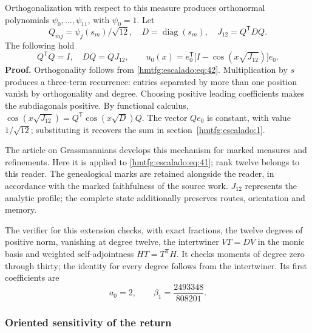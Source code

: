 Orthogonalization with respect to this measure produces orthonormal polynomials \(\psi_0,\ldots,\psi_{11}\), with \(\psi_0=1\). Let
\[
Q_{mj}=\psi_j(s_m)/\sqrt{12},\quad
D=\operatorname{diag}(s_m),\quad J_{12}=Q^{\mathsf T}DQ.
\]
The following hold
\begin{equation}
Q^{\mathsf T}Q=I,\quad DQ=QJ_{12},\qquad
\boxed{u_0(x)=e_0^{\mathsf T}
\bigl[I-\cos(x\sqrt{J_{12}})\bigr]e_0.}
\label{hmtfg:escalado:eq:43}
\end{equation}
\textbf{Proof.} Orthogonality follows from \eqref{hmtfg:escalado:eq:42}. Multiplication by \(s\) produces a three-term recurrence: entries separated by more than one position vanish by orthogonality and degree. Choosing positive leading coefficients makes the subdiagonals positive. By functional calculus,
\(\cos(x\sqrt{J_{12}})=Q^{\mathsf T}\cos(x\sqrt D)Q\).
The vector \(Qe_0\) is constant, with value \(1/\sqrt{12}\); substituting it recovers the sum in section~\ref{hmtfg:escalado:1}.

The article on Grassmannians develops this mechanism for marked measures and refinements. Here it is applied to \eqref{hmtfg:escalado:eq:41}; rank twelve belongs to this reader. The genealogical marks are retained alongside the reader, in accordance with the marked faithfulness of the source work. \(J_{12}\) represents the analytic profile; the complete state additionally preserves routes, orientation and memory.

The verifier for this extension checks, with exact fractions, the twelve degrees of positive norm, vanishing at degree twelve, the intertwiner \(VT=DV\) in the monic basis and weighted self-adjointness \(HT=T^{\mathsf T}H\). It checks moments of degree zero through thirty; the identity for every degree follows from the intertwiner. Its first coefficients are
\begin{equation}
a_0=2,\qquad \beta_1=\frac{2493348}{808201}.
\label{hmtfg:escalado:eq:44}
\end{equation}

\subsubsection{Oriented sensitivity of the return}
\label{hmtfg:escalado:14.3}

